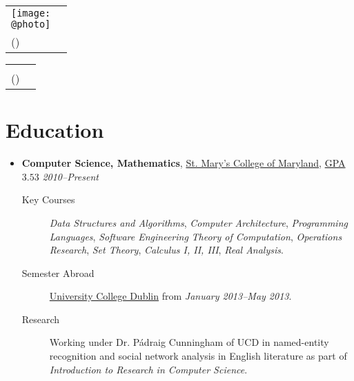 \documentclass[11pt,letterpaper]{article}
\author{Sean Edward Allred}
\makeatletter
\newcommand{\position}[5]{\item%
  \begin{tabular*}{1.0\linewidth}{l@{\extracolsep{\fill}}r}
    #1 & #2\\
    \textit{#3} & \textit{#4---#5}
  \end{tabular*}}
\renewcommand{\position}[6][]{%
\item[#1] \hspace*{-2em}\textbf{#4}, #2, #3\hfill
  \textit{#5--#6}\vspace*{-.8em}}
\renewcommand{\maketitle}{%
  \noindent
  \ifdefined\@photo
  \usepackage{multirow}
  \begin{tabular*}{1.0\linewidth}{l@{\extracolsep{\fill}}r}
    \multirow{2}{*}{\texttt{[image: \\@photo]}}\\
     {\@namestyle\@author}           & \@addressA\\
    {\@emailstyle\@email} (\@phone)  & \@addressB
  \end{tabular*}
  \else
  \begin{tabular*}{1.0\linewidth}{l@{\extracolsep{\fill}}r}
     {\@namestyle\@author}           & \@addressA\\
    {\@emailstyle\@email} (\@phone)  & \@addressB
  \end{tabular*}
  \fi
}
\newcommand{\course}[1]{\textit{#1}}
\newcommand{\smcm}{\href{http://www.smcm.edu}
                        {St. Mary's College of Maryland}}
\makeatother
\begin{document}
\maketitle

\section*{Education}
\begin{itemize}
\position[] {\smcm}
          {\href{http://dl.dropbox.com/u/17471132/transcript20130330.pdf}
                {GPA $3.53$}}
          {Computer Science, Mathematics}
          {2010}{Present}
          \begin{description}
          \item[Key Courses] \course{Data Structures and Algorithms},
            \course{Computer Architecture}, \course{Programming
              Languages}, \course{Software Engineering} \course{Theory
              of Computation}, \course{Operations Research},
            \course{Set Theory}, \course{Calculus I, II, III},
            \course{Real Analysis}.
          \item[Semester Abroad] \href{http://www.ucd.ie}{University
              College Dublin} from \textit{January 2013--May 2013}.
          \item[Research] Working under Dr. P\'adraig Cunningham of
            UCD in named-entity recognition and social network
            analysis in English literature as part of
            \textit{Introduction to Research in Computer Science}.
          \end{description}
\end{itemize}
\end{document}
